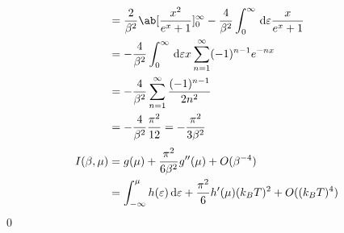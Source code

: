 \documentclass[uplatex,diffipdfmx,a4paper,11pt]{jlreq}
\makeatletter
\numberwithin{equation}{section}
\theoremstyle{definition}
\renewenvironment{proof}[1][\proofname]{\par
  \normalfont
  \topsep6\p@\@plus6\p@ \trivlist
  \item[\hskip\labelsep{\bfseries #1}\@addpunct{\bfseries}]\ignorespaces\quad\par
}{%
  \qed\endtrivlist\@endpefalse
}
\renewcommand\proofname{証明}
\makeatother
\begin{document}
\begin{proof}
\begin{align}
                                                                                  & = \frac{2}{\beta^2}\ab[\frac{x^2}{e^x + 1}]_{0}^{\infty} - \frac{4}{\beta^2}\int_{0}^{\infty}\dl{\varepsilon}\frac{x}{e^x + 1}                                      \\
                                                                                  & = - \frac{4}{\beta^2}\int_{0}^{\infty}\dl{\varepsilon}x\sum_{n=1}^{\infty}(-1)^{n-1}e^{-nx}                                                                         \\
                                                                                  & = - \frac{4}{\beta^2}\sum_{n=1}^{\infty}\frac{(-1)^{n-1}}{2n^2}                                                                                                     \\
                                                                                  & = - \frac{4}{\beta^2}\frac{\pi^2}{12} = -\frac{\pi^2}{3\beta^2}
  \end{align}
  \begin{align}
    I(\beta, \mu) & = g(\mu) + \frac{\pi^2}{6\beta^2}g''(\mu) + O(\beta^{-4})                                            \\
                  & = \int_{-\infty}^\mu h(\varepsilon)\dl{\varepsilon} + \frac{\pi^2}{6}h'(\mu)(k_BT)^2 + O((k_BT)^{4})
  \end{align}
\end{proof}
\end{document}
